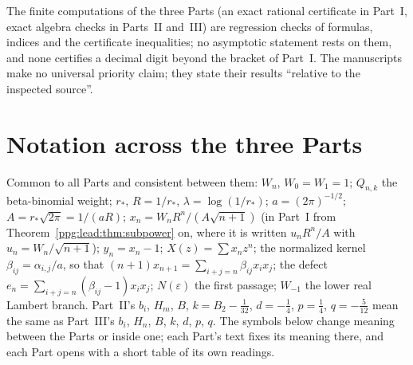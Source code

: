 \documentclass[11pt,letterpaper]{article}
\theoremstyle{remark}\newtheorem{remark}[theorem]{Remark}
\numberwithin{equation}{section}
\begin{document}
The finite computations of the three Parts (an exact rational certificate in Part~I, exact algebra checks in Parts~II and~III) are regression checks of formulas, indices and the certificate inequalities; no asymptotic statement rests on them, and none certifies a decimal digit beyond the bracket of Part~I. The manuscripts make no universal priority claim; they state their results ``relative to the inspected source''.

\section*{Notation across the three Parts}\label{ppg:sec:notation}
Common to all Parts and consistent between them: $W_n$, $W_0=W_1=1$; $Q_{n,k}$ the beta-binomial weight; $r_*$, $R=1/r_*$, $\lambda=\log(1/r_*)$; $a=(2\pi)^{-1/2}$; $A=r_*\sqrt{2\pi}=1/(aR)$; $x_n=W_nR^n/(A\sqrt{n+1})$ (in Part~I from Theorem~\ref{ppg:lead:thm:subpower} on, where it is written $u_nR^n/A$ with $u_n=W_n/\sqrt{n+1}$); $y_n=x_n-1$; $X(z)=\sum x_nz^n$; the normalized kernel $\beta_{ij}=\alpha_{i,j}/a$, so that $(n+1)x_{n+1}=\sum_{i+j=n}\beta_{ij}x_ix_j$; the defect $e_n=\sum_{i+j=n}(\beta_{ij}-1)x_ix_j$; $N(\varepsilon)$ the first passage; $W_{-1}$ the lower real Lambert branch. Part~II's $b_i$, $H_m$, $B$, $k=B_2-\frac1{32}$, $d=-\frac14$, $p=\frac14$, $q=-\frac5{12}$ mean the same as Part~III's $b_i$, $H_n$, $B$, $k$, $d$, $p$, $q$. The symbols below change meaning between the Parts or inside one; each Part's text fixes its meaning there, and each Part opens with a short table of its own readings.
\begingroup\small
\end{document}
